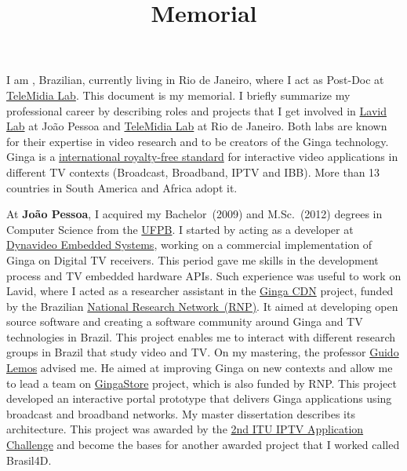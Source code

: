 \documentclass[10pt,a4paper,sans,colorlinks]{moderncv}
\title{Memorial}
\begin{document}
\hfHyperrefSetupBlueLinks
\makecvtitle

\setlength{\parindent}{15pt}
I am \myname, Brazilian, currently living in Rio de Janeiro, where I act as Post-Doc at \href{http://telemidia.puc-rio.br/}{TeleMidia Lab}.
This document is my memorial.
I briefly summarize my professional career by describing roles and projects that I get involved in \href{http://www.lavid.ufpb.br}{Lavid Lab} at João Pessoa and \href{http://telemidia.puc-rio.br/}{TeleMidia Lab} at Rio de Janeiro.
Both labs are known for their expertise in video research and to be creators of the Ginga technology.
Ginga is a \href{https://www.itu.int/rec/T-REC-H.761}{international royalty-free standard} for interactive video applications in different TV contexts (Broadcast, Broadband, IPTV and IBB).
More than 13 countries in South America and Africa adopt it.

At \textbf{João Pessoa}, I acquired my Bachelor~(2009) and M.Sc.~(2012) degrees in Computer Science from the \href{www.ufpb.br}{UFPB}.
I started by acting as a developer at \href{https://www.dynavideo.com.br}{Dynavideo Embedded Systems}, working on a commercial implementation of Ginga on Digital TV receivers.
This period gave me skills in the development process and TV embedded hardware APIs.
Such experience was useful to work on Lavid, where I acted as a researcher assistant in
the \href{http://www.redetic.rnp.br/ctic/2019/01/29/gingarap-gingafrevo/}{Ginga CDN}
project, funded by the Brazilian \href{https://www.rnp.br}{ National Research Network~(RNP)}.
It aimed at developing open source software and creating a software community around Ginga and TV technologies in Brazil.
This project enables me to interact with different research groups in Brazil that study video and TV.
On my mastering, the professor \href{https://www.linkedin.com/in/guido-lemos-5361a48/?originalSubdomain=br}{Guido Lemos} advised me.
He aimed at improving Ginga on new contexts and allow me to lead a team on \href{http://www.redetic.rnp.br/ctic/2019/01/29/ginga-appstore/}{GingaStore} project, which is also funded by RNP.
This project developed an interactive portal prototype that delivers Ginga applications using broadcast and broadband networks.
My master dissertation describes its architecture.
This project was awarded by the \href{http://itu.int/en/ITU-T/challenges/pages/iptv.aspx}{2nd ITU IPTV Application Challenge} and become the bases for another awarded project that I worked called Brasil4D.
\end{document}
